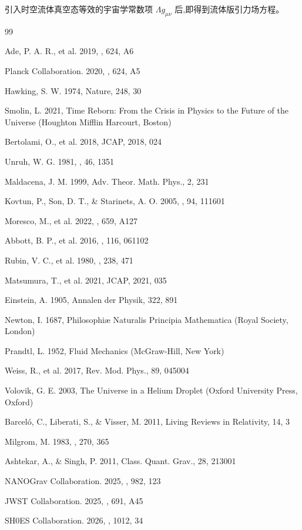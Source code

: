 \documentclass[11pt,a4paper]{article}
\begin{document}
引入时空流体真空态等效的宇宙学常数项 $\Lambda g_{\mu\nu}$ 后,即得到流体版引力场方程。

\begin{thebibliography}{99}

 Ade, P. A. R., et al. 2019, \aap, 624, A6

 Planck Collaboration. 2020, \aap, 624, A5

 Hawking, S. W. 1974, Nature, 248, 30

 Smolin, L. 2021, Time Reborn: From the Crisis in Physics to the Future of the Universe (Houghton Mifflin Harcourt, Boston)

 Bertolami, O., et al. 2018, JCAP, 2018, 024

 Unruh, W. G. 1981, \prl, 46, 1351

 Maldacena, J. M. 1999, Adv. Theor. Math. Phys., 2, 231

 Kovtun, P., Son, D. T., \& Starinets, A. O. 2005, \prl, 94, 111601

 Moresco, M., et al. 2022, \aap, 659, A127

 Abbott, B. P., et al. 2016, \prl, 116, 061102

 Rubin, V. C., et al. 1980, \apj, 238, 471

 Matsumura, T., et al. 2021, JCAP, 2021, 035

 Einstein, A. 1905, Annalen der Physik, 322, 891

 Newton, I. 1687, Philosophiæ Naturalis Principia Mathematica (Royal Society, London)

 Prandtl, L. 1952, Fluid Mechanics (McGraw-Hill, New York)

 Weiss, R., et al. 2017, Rev. Mod. Phys., 89, 045004

 Volovik, G. E. 2003, The Universe in a Helium Droplet (Oxford University Press, Oxford)

 Barceló, C., Liberati, S., \& Visser, M. 2011, Living Reviews in Relativity, 14, 3

 Milgrom, M. 1983, \apj, 270, 365

 Ashtekar, A., \& Singh, P. 2011, Class. Quant. Grav., 28, 213001

 NANOGrav Collaboration. 2025, \apj, 982, 123

 JWST Collaboration. 2025, \aap, 691, A45

 SH0ES Collaboration. 2026, \apj, 1012, 34

\end{thebibliography}
\end{document}
